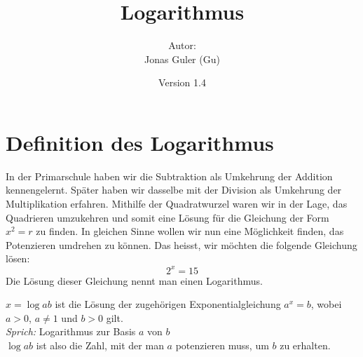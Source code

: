 \documentclass[11pt,oneside]{article}
\newcommand{\Skriptname}{Logarithmus}
\newcommand{\Autor}{Jonas Guler (Gu)}
\begin{document}
\begin{titlepage}
	\clearpage
	\title{\Huge\textbf{\Skriptname} \\[1cm]}
	\author{Autor:\\ \Autor}
	\date{\normalsize {Version 1.4}\\ \datelong}
	\maketitle
	\thispagestyle{empty}
	\vfill
	\tableofcontents
\end{titlepage}
\section{Definition des Logarithmus}
	In der Primarschule haben wir die Subtraktion als Umkehrung der Addition kennengelernt. Später haben wir dasselbe mit der Division als Umkehrung der Multiplikation erfahren. Mithilfe der Quadratwurzel waren wir in der Lage, das Quadrieren umzukehren und somit eine Lösung für die Gleichung der Form $x^2=r$ zu finden. In gleichen Sinne wollen wir nun eine Möglichkeit finden, das Potenzieren umdrehen zu können. Das heisst, wir möchten die folgende Gleichung lösen:
	\[2^x=15\]
	Die Lösung dieser Gleichung nennt man einen Logarithmus.
	\begin{definition}
		$x=\log{a}{b}$ ist die Lösung der zugehörigen Exponentialgleichung $a^x=b$, wobei $a>0$, $a\neq1$ und $b>0$ gilt.\\
		\emph{Sprich:} Logarithmus zur Basis $a$ von $b$\\
		$\log{a}{b}$ ist also die Zahl, mit der man $a$ potenzieren muss, um $b$ zu erhalten.
	\end{definition}
\end{document}
